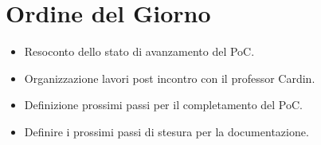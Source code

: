 \section{Ordine del Giorno}

\begin{itemize}
    \item Resoconto dello stato di avanzamento del PoC.
    \item Organizzazione lavori post incontro con il professor Cardin.
    \item Definizione prossimi passi per il completamento del PoC.
    \item Definire i prossimi passi di stesura per la documentazione.
\end{itemize}

